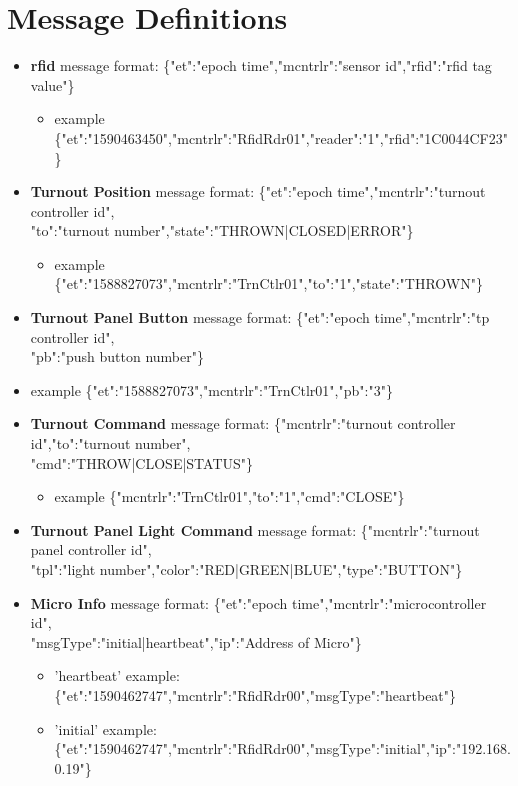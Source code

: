 \section{Message Definitions}
\begin{itemize}
\item \textbf {\gls{rfid}} message format: \{"et":"epoch time","mcntrlr":"sensor id","rfid":"rfid tag value"\}
\begin{itemize}
\item example \{"et":"1590463450","mcntrlr":"RfidRdr01","reader":"1","rfid":"1C0044CF23"\}
\end{itemize}
\item \textbf {Turnout Position} message format: \{"et":"epoch time","mcntrlr":"turnout controller id", \\"to":"turnout number","state":"THROWN|CLOSED|ERROR"\}
\begin{itemize}
\item example \{"et":"1588827073","mcntrlr":"TrnCtlr01","to":"1","state":"THROWN"\}
\end{itemize}
\item \textbf {Turnout Panel Button} message format: \{"et":"epoch time","mcntrlr":"tp controller id", \\"pb":"push button number"\}
\item example \{"et":"1588827073","mcntrlr":"TrnCtlr01","pb":"3"\}
\item \textbf {Turnout Command} message format: \{"mcntrlr":"turnout controller id","to":"turnout number", \\"cmd":"THROW|CLOSE|STATUS"\}
\begin{itemize}
\item example \{"mcntrlr":"TrnCtlr01","to":"1","cmd":"CLOSE"\}
\end{itemize}
\item \textbf {Turnout Panel Light Command} message format: \{"mcntrlr":"turnout panel controller id", \\"tpl":"light number","color":"RED|GREEN|BLUE","type":"BUTTON"\}
\item \textbf {Micro Info} message format: \{"et":"epoch time","mcntrlr":"microcontroller id", \\"msgType":"initial|heartbeat","ip":"Address of Micro"\}
\begin{itemize}
\item 'heartbeat' example: \{"et":"1590462747","mcntrlr":"RfidRdr00","msgType":"heartbeat"\} 
\item 'initial' example: \{"et":"1590462747","mcntrlr":"RfidRdr00","msgType":"initial","ip":"192.168.0.19"\}
\end{itemize}
\end{itemize}
